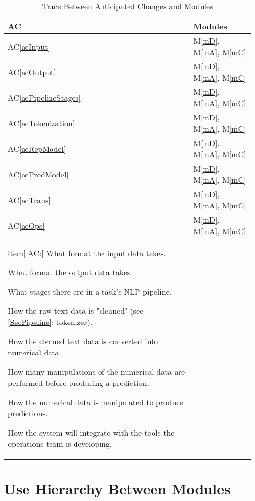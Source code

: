 \documentclass[12pt, titlepage]{article}
\newcounter{acnum}
\newcommand{\actheacnum}{AC\theacnum}
\newcommand{\acref}[1]{AC\ref{#1}}
\newcommand{\mref}[1]{M\ref{#1}}
\begin{document}
\begin{table}[H]
\centering
\begin{tabular}{p{} p{}}
\toprule
\textbf{AC} & \textbf{Modules}\\
\midrule
\acref{acInput} & \mref{mD}, \mref{mA}, \mref{mC}\\
\acref{acOutput} & \mref{mD}, \mref{mA}, \mref{mC}\\
\acref{acPipelineStages} & \mref{mD}, \mref{mA}, \mref{mC}\\
\acref{acTokenization} & \mref{mD}, \mref{mA}, \mref{mC}\\
\acref{acRepModel} & \mref{mD}, \mref{mA}, \mref{mC}\\
\acref{acPredModel} & \mref{mD}, \mref{mA}, \mref{mC}\\
\acref{acTrans} & \mref{mD}, \mref{mA}, \mref{mC}\\
\acref{acOps} & \mref{mD}, \mref{mA}, \mref{mC}\\

item[{acnum} \actheacnum \label{acInput}:] What format the input data takes.
\item[\refstepcounter{acnum} \actheacnum \label{acOutput}:] What format the output data takes.
\item[\refstepcounter{acnum} \actheacnum \label{acPipelineStages}:] What stages there are in a task's NLP pipeline.
\item[\refstepcounter{acnum} \actheacnum \label{acTokenization}:] How the raw text data is "cleaned" (see \ref{SecPipeline}: tokenizer).
\item[\refstepcounter{acnum} \actheacnum \label{acRepModel}:] How the cleaned text data is converted into numerical data.
\item[\refstepcounter{acnum} \actheacnum \label{acPredModel}:] How many manipulations of the numerical data are performed before producing a prediction.
\item[\refstepcounter{acnum} \actheacnum \label{acTrans}:] How the numerical data is manipulated to produce predictions.
\item[\refstepcounter{acnum} \actheacnum \label{acOps}:] How the system will integrate with the tools the operations team is developing.

\bottomrule
\end{tabular}
\caption{Trace Between Anticipated Changes and Modules}
\label{TblACT}
\end{table}

\section{Use Hierarchy Between Modules} \label{SecUse}
\end{document}
